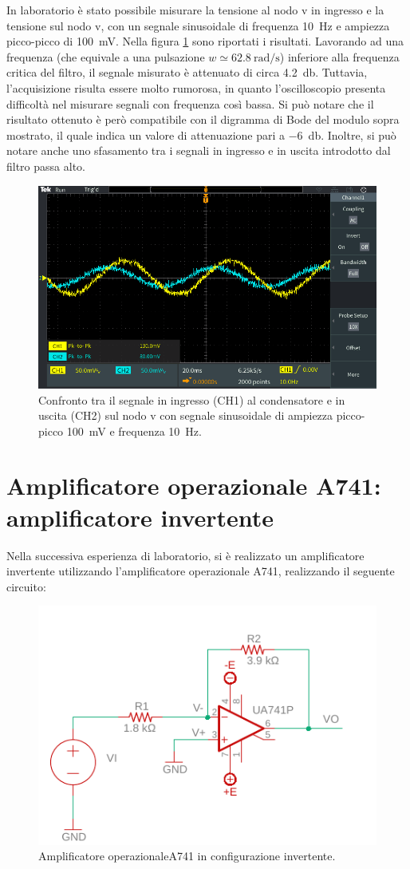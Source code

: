 \noindent
In laboratorio è stato possibile misurare la tensione al nodo v in ingresso e la tensione sul nodo v, con un segnale sinusoidale di frequenza \SI{10}{\hertz} e ampiezza picco-picco di \SI{100}{\milli\volt}. Nella figura \ref{fig:hpf_10hz} sono riportati i risultati. Lavorando ad una frequenza (che equivale a una pulsazione $w\simeq\SI{62.8}{\radian/\second}$) inferiore alla frequenza critica del filtro, il segnale misurato è attenuato di circa \SI{4.2}{\decibel}. Tuttavia, l'acquisizione risulta essere molto rumorosa, in quanto l'oscilloscopio presenta difficoltà nel misurare segnali con frequenza così bassa. Si può notare che il risultato ottenuto è però compatibile con il digramma di Bode del modulo sopra mostrato, il quale indica un valore di attenuazione pari a \SI{-6}{\decibel}. Inoltre, si può notare anche uno sfasamento tra i segnali in ingresso e in uscita introdotto dal filtro passa alto.
\begin{figure}[h!]
	\centering
	\includegraphics[width=0.7\linewidth]{./ImageFiles/Laboratorio 4/TEK00003}
	\caption{Confronto tra il segnale in ingresso (CH1) al condensatore e in uscita (CH2) sul nodo v con segnale sinusoidale di ampiezza picco-picco \SI{100}{\milli\volt} e frequenza \SI{10}{\hertz}.}
	\label{fig:hpf_10hz}
\end{figure}

\section{Amplificatore operazionale \textmu A741: amplificatore invertente}
Nella successiva esperienza di laboratorio, si è realizzato un amplificatore invertente utilizzando l'amplificatore operazionale \textmu A741, realizzando il seguente circuito:
\begin{figure}[h!]
	\centering
	\includegraphics[width=0.6\linewidth]{./OtherFiles/Laboratorio 4/opam_inv}
	\caption{Amplificatore operazionale\textmu A741 in configurazione invertente.}
	\label{fig:opamp_inv}
\end{figure}


